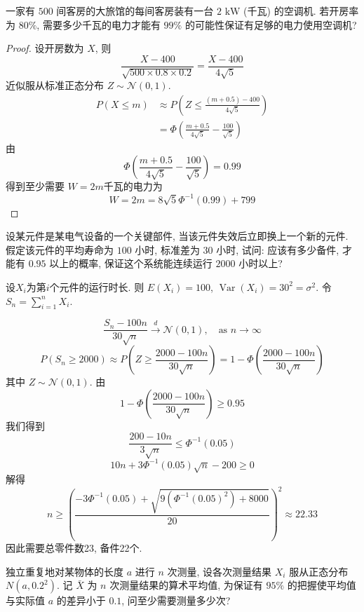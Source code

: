 \documentclass[../main.tex]{subfiles}
\begin{document}
\begin{exercise}{}{}
一家有 $500$ 间客房的大旅馆的每间客房装有一台 $2\text{ kW}$ (千瓦) 的空调机. 若开房率为 $80\%$, 需要多少千瓦的电力才能有 $99\%$ 的可能性保证有足够的电力使用空调机?
\end{exercise}
\begin{proof}
设开房数为 $X$, 则
 $$ \frac{X-400 }{ \sqrt{500\times 0.8\times 0.2}}= \frac{X-400 }{4\sqrt{5} } $$
近似服从标准正态分布 $Z\sim \mathcal{N}\left(0,1\right)$.
 $$ \begin{aligned} P\left(X\le m\right)&\approx P\left(Z\le \frac{\left(m+ 0.5\right)-400 }{4\sqrt{5} }\right)\\&= \Phi \left(\frac{m+ 0.5 }{4\sqrt{5} }-\frac{100 }{\sqrt{5} }\right)\end{aligned} $$
由
$$ \Phi \left(\frac{m+ 0.5 }{4\sqrt{5} }-\frac{100 }{\sqrt{5} }\right)= 0.99 $$
得到至少需要 $W= 2m$千瓦的电力为
 $$W= 2 m= 8\sqrt{5}\Phi ^{-1} \left(0.99\right)+ 799$$
\end{proof}
\begin{exercise}{}{}
设某元件是某电气设备的一个关键部件, 当该元件失效后立即换上一个新的元件. 假定该元件的平均寿命为 $100$ 小时, 标准差为 $30$ 小时, 试问: 应该有多少备件, 才能有 $0.95$ 以上的概率, 保证这个系统能连续运行 $2000$ 小时以上?
\end{exercise}
\begin{solution}
设$X_{i}$为第$i$个元件的运行时长. 则 $E\left(X_{i}\right)= 100$, $\operatorname{Var}\left(X_{i}\right)= 30^{2}= \sigma ^{2}$.
令 $S_{n}= \sum _{i= 1}^{n}X_{i}$.

 $$ \frac{S_{n}-100n }{30\sqrt{n} } \xrightarrow{d} \mathcal{N}\left(0,1\right),\quad \text{as }n\to \infty  $$
 $$ P\left(S_{n}\ge 2000\right)\approx P\left(Z\ge \frac{2000-100n }{30\sqrt{n} }\right)= 1-\Phi \left(\frac{2000-100n }{30\sqrt{n} }\right) $$
其中 $Z\sim \mathcal{N}\left(0,1\right)$.
由
 $$ 1-\Phi \left(\frac{2000-100n }{ 30\sqrt{n}}\right)\ge 0.95 $$
我们得到
 $$ \frac{200-10n }{3\sqrt{n} }\le \Phi ^{-1} \left(0.05\right)$$
 $$ 10n+ 3\Phi ^{-1} \left(0.05\right)\sqrt{n}-200\ge 0 $$
解得
 $$ n\ge \left( \frac{-3\Phi ^{-1} \left(0.05\right)+ \sqrt{9\left(\Phi ^{-1} \left(0.05\right)^{2}\right)+ 8000} }{20 }\right) ^{2}\approx 22.33$$
因此需要总零件数23, 备件22个.
\end{solution}
\begin{exercise}{}{}
独立重复地对某物体的长度 $a$ 进行 $n$ 次测量, 设各次测量结果 $X_i$ 服从正态分布 $N(a,0.2^2)$. 记 $\bar{X}$ 为 $n$ 次测量结果的算术平均值, 为保证有 $95\%$ 的把握使平均值与实际值 $a$ 的差异小于 $0.1$, 问至少需要测量多少次?
\end{exercise}
\end{document}
